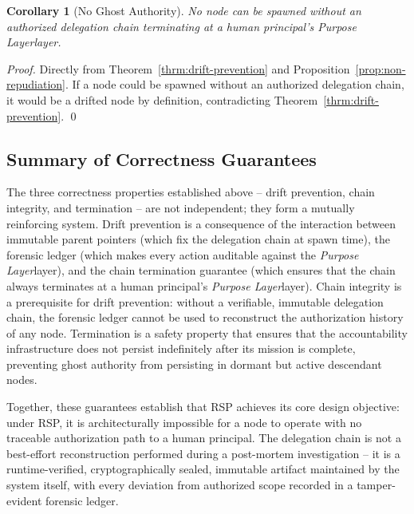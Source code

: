 \documentclass[12pt]{article}
\newtheorem{cor}[section]{Corollary}
\def\purpose{\textit{Purpose Layer}}
\begin{document}
\begin{cor}[No Ghost Authority]
\label{cor:ghost-authority}
No node can be spawned without an authorized delegation chain terminating at a human principal's \purpose layer.
\end{cor}

\begin{proof}
Directly from Theorem~\ref{thrm:drift-prevention} and Proposition~\ref{prop:non-repudiation}. If a node could be spawned without an authorized delegation chain, it would be a drifted node by definition, contradicting Theorem~\ref{thrm:drift-prevention}. \qed
\end{proof}

\subsection{Summary of Correctness Guarantees}

The three correctness properties established above -- drift prevention, chain integrity, and termination -- are not independent; they form a mutually reinforcing system. Drift prevention is a consequence of the interaction between immutable parent pointers (which fix the delegation chain at spawn time), the forensic ledger (which makes every action auditable against the \purpose layer), and the chain termination guarantee (which ensures that the chain always terminates at a human principal's \purpose layer). Chain integrity is a prerequisite for drift prevention: without a verifiable, immutable delegation chain, the forensic ledger cannot be used to reconstruct the authorization history of any node. Termination is a safety property that ensures that the accountability infrastructure does not persist indefinitely after its mission is complete, preventing ghost authority from persisting in dormant but active descendant nodes.

Together, these guarantees establish that RSP achieves its core design objective: under RSP, it is architecturally impossible for a node to operate with no traceable authorization path to a human principal. The delegation chain is not a best-effort reconstruction performed during a post-mortem investigation -- it is a runtime-verified, cryptographically sealed, immutable artifact maintained by the system itself, with every deviation from authorized scope recorded in a tamper-evident forensic ledger.
\end{document}
